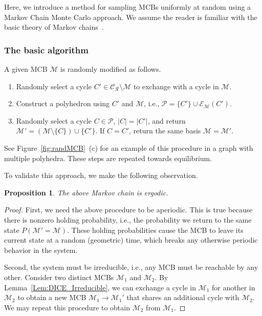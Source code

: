 \documentclass[fleqn,11pt]{article}
\newtheorem{prop}{Proposition}
\newcommand\calM{\mathcal{M}}
\newcommand\calP{\mathcal{P}}     %
\newcommand\RelCyc{\mathcal{C_R}} %
\newcommand\expand[2]{\mathcal{E}_{#1}\left(#2\right)}   %
\begin{document}
Here, we introduce a method for sampling MCBs uniformly at random using a Markov Chain Monte Carlo approach.
We assume the reader is familiar with the basic theory of Markov chains~\cite{durrettEssentials2012}. 

\subsubsection{The basic algorithm}
A given MCB $\calM$ is randomly modified as follows.
\begin{enumerate}
	\item Randomly select a cycle $C'\in\RelCyc\setminus\calM$ to exchange with a cycle in $\calM$.
	\item Construct a polyhedron using $C'$ and $\calM$, i.e., $\calP = \{C'\}\cup\expand{\calM}{C'}$.
	\item Randomly select a cycle $C{\in}\calP$, $|C|{=}|C'|$, and return %
	$\calM'=(\calM\setminus\{C\})\cup\{C'\}$. 
	If $C=C'$, return the same basis $\calM=\calM'$.
\end{enumerate} 
See Figure~\ref{fig:randMCB}~(c) for an example of this procedure in a graph with multiple polyhedra. These steps are repeated towards equilibrium.

To validate this approach, we make the following observation.
\begin{prop}
	The above Markov chain is ergodic.
\end{prop}
\begin{proof}
	First, we need the above procedure to be aperiodic. This is true because there is nonzero holding probability, i.e., the probability we return to the same state $P(\calM'=\calM)$. These holding probabilities cause the MCB to leave its current state at a random (geometric) time, which breaks any otherwise periodic behavior in the system.
	
	Second, the system must be irreducible, i.e., any MCB must be reachable by any other. Consider two distinct MCBs $\calM_1$ and $\calM_2$. By Lemma~\ref{Lem:DICE_Irreducible}, we can exchange a cycle in $\calM_1$ for another in $\calM_2$ to obtain a new MCB $\calM_1{\to}\calM_1'$ that shares an additional cycle with $\calM_2$. We may repeat this procedure to obtain $\calM_2$ from $\calM_1$.
\end{proof}
\end{document}
